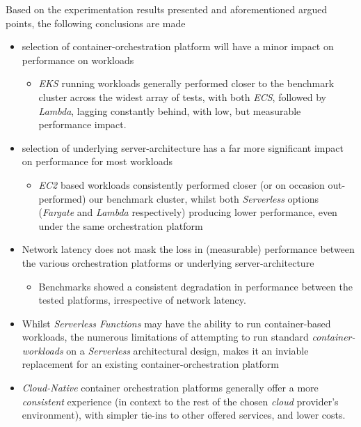 \noindent Based on the experimentation results presented and aforementioned argued points, the following conclusions are made
\begin{itemize}
      \item selection of container-orchestration platform will have a minor impact on performance on workloads
            \begin{itemize}
                  \item \textit{EKS} running workloads generally performed closer to the benchmark cluster across the widest array of tests,
                        with both \textit{ECS}, followed by \textit{Lambda}, lagging constantly behind, with low, but measurable performance impact.
            \end{itemize}
      \item selection of underlying server-architecture has a far more significant impact on performance for most workloads
            \begin{itemize}
                  \item \textit{EC2} based workloads consistently performed closer (or on occasion out-performed) our benchmark cluster,
                        whilst both \textit{Serverless} options (\textit{Fargate} and \textit{Lambda} respectively) producing lower performance,
                        even under the same orchestration platform
            \end{itemize}
      \item Network latency does not mask the loss in (measurable) performance between the various orchestration platforms or underlying server-architecture
            \begin{itemize}
                  \item Benchmarks showed a consistent degradation in performance between the tested platforms, irrespective of network latency.
            \end{itemize}
      \item Whilst \textit{Serverless Functions} may have the ability to run container-based workloads,
            the numerous limitations of attempting to run standard \textit{container-workloads} on a
            \textit{Serverless} architectural design, makes it an inviable replacement for an existing container-orchestration platform
      \item \textit{Cloud-Native} container orchestration platforms generally offer a more \emph{consistent} experience
            (in context to the rest of the chosen \textit{cloud} provider's environment), with simpler tie-ins to other offered services, and lower costs.

\end{itemize}
